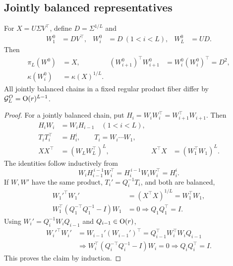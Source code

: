 \subsection{Jointly balanced representatives}
\begin{theorem}
For $X=U\Sigma V^\top$, define $D=\Sigma^{1/L}$ and
\begin{align}
W_1^0&=DV^\top,&W_i^0&=D\ (1<i<L),&
W_L^0&=UD .
\label{eq:rigid-canonical-chain}
\end{align}
Then
\begin{align}
\pi_L(W^0)&=X,&
(W_{i+1}^0)^\top W_{i+1}^0&=W_i^0(W_i^0)^\top=D^2,\\
\kappa(W_i^0)&=\kappa(X)^{1/L}.
\end{align}
All jointly balanced chains in a fixed regular product fiber differ by
$\mathcal G_L^O={\rm O}(r)^{L-1}$.
\end{theorem}
\begin{proof}
For a jointly balanced chain, put $H_i=W_iW_i^\top=W_{i+1}^\top W_{i+1}$.
Then
\begin{align}
H_iW_i&=W_iH_{i-1}\quad(1<i<L),\\
T_iT_i^\top&=H_i^i,\qquad T_i=W_i\cdots W_1,\\
XX^\top&=(W_LW_L^\top)^L,&
X^\top X&=(W_1^\top W_1)^L .
\end{align}
The identities follow inductively from
\begin{equation}
W_iH_{i-1}^{\,i-1}W_i^\top
=H_i^{\,i-1}W_iW_i^\top=H_i^i .
\end{equation}
If $W,W'$ have the same product, $T_i'=Q_i^{-1}T_i$, and both are balanced,
\begin{align}
W_1'^\top W_1'&=(X^\top X)^{1/L}=W_1^\top W_1,\\
W_1^\top(Q_1^{-\top}Q_1^{-1}-I)W_1&=0
\Longrightarrow Q_1Q_1^\top=I .
\end{align}
Using $W_i'=Q_i^{-1}W_iQ_{i-1}$ and $Q_{i-1}\in{\rm O}(r)$,
\begin{align}
W_i'^\top W_i'&=W_{i-1}'(W_{i-1}')^\top
=Q_{i-1}^\top W_i^\top W_iQ_{i-1}\\
&\Longrightarrow W_i^\top(Q_i^{-\top}Q_i^{-1}-I)W_i=0
\Longrightarrow Q_iQ_i^\top=I .
\end{align}
This proves the claim by induction.
\end{proof}

